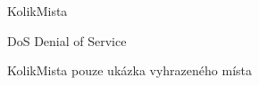 \begin{seznamzkratek}{KolikMista}

		{DoS}
		{Denial of Service}


		{KolikMista}
		{pouze ukázka vyhrazeného místa}

\end{seznamzkratek}
